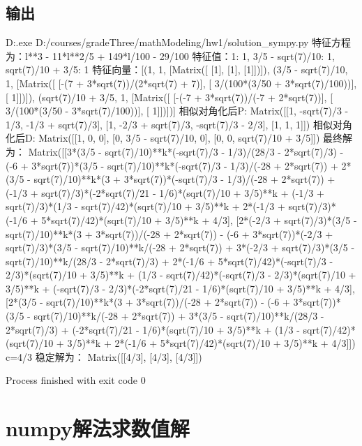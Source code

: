 \subsection{输出}
\begin{python}
D:\program\Anaconda\python.exe D:/courses/gradeThree/mathModeling/hw1/solution_sympy.py
特征方程为：l**3 - 11*l**2/5 + 149*l/100 - 29/100
特征值：{1: 1, 3/5 - sqrt(7)/10: 1, sqrt(7)/10 + 3/5: 1}
特征向量：[(1, 1, [Matrix([
[1],
[1],
[1]])]), (3/5 - sqrt(7)/10, 1, [Matrix([
[-(7 + 3*sqrt(7))/(2*sqrt(7) + 7)],
[  3/(100*(3/50 + 3*sqrt(7)/100))],
[                               1]])]), (sqrt(7)/10 + 3/5, 1, [Matrix([
[-(-7 + 3*sqrt(7))/(-7 + 2*sqrt(7))],
[    3/(100*(3/50 - 3*sqrt(7)/100))],
[                                 1]])])]
相似对角化后P:
Matrix([[1, -sqrt(7)/3 - 1/3, -1/3 + sqrt(7)/3], [1, -2/3 + sqrt(7)/3, -sqrt(7)/3 - 2/3], [1, 1, 1]])
相似对角化后D:
Matrix([[1, 0, 0], [0, 3/5 - sqrt(7)/10, 0], [0, 0, sqrt(7)/10 + 3/5]])
最终解为：
Matrix([[3*(3/5 - sqrt(7)/10)**k*(-sqrt(7)/3 - 1/3)/(28/3 - 2*sqrt(7)/3) - (-6 + 3*sqrt(7))*(3/5 - sqrt(7)/10)**k*(-sqrt(7)/3 - 1/3)/(-28 + 2*sqrt(7)) + 2*(3/5 - sqrt(7)/10)**k*(3 + 3*sqrt(7))*(-sqrt(7)/3 - 1/3)/(-28 + 2*sqrt(7)) + (-1/3 + sqrt(7)/3)*(-2*sqrt(7)/21 - 1/6)*(sqrt(7)/10 + 3/5)**k + (-1/3 + sqrt(7)/3)*(1/3 - sqrt(7)/42)*(sqrt(7)/10 + 3/5)**k + 2*(-1/3 + sqrt(7)/3)*(-1/6 + 5*sqrt(7)/42)*(sqrt(7)/10 + 3/5)**k + 4/3], [2*(-2/3 + sqrt(7)/3)*(3/5 - sqrt(7)/10)**k*(3 + 3*sqrt(7))/(-28 + 2*sqrt(7)) - (-6 + 3*sqrt(7))*(-2/3 + sqrt(7)/3)*(3/5 - sqrt(7)/10)**k/(-28 + 2*sqrt(7)) + 3*(-2/3 + sqrt(7)/3)*(3/5 - sqrt(7)/10)**k/(28/3 - 2*sqrt(7)/3) + 2*(-1/6 + 5*sqrt(7)/42)*(-sqrt(7)/3 - 2/3)*(sqrt(7)/10 + 3/5)**k + (1/3 - sqrt(7)/42)*(-sqrt(7)/3 - 2/3)*(sqrt(7)/10 + 3/5)**k + (-sqrt(7)/3 - 2/3)*(-2*sqrt(7)/21 - 1/6)*(sqrt(7)/10 + 3/5)**k + 4/3], [2*(3/5 - sqrt(7)/10)**k*(3 + 3*sqrt(7))/(-28 + 2*sqrt(7)) - (-6 + 3*sqrt(7))*(3/5 - sqrt(7)/10)**k/(-28 + 2*sqrt(7)) + 3*(3/5 - sqrt(7)/10)**k/(28/3 - 2*sqrt(7)/3) + (-2*sqrt(7)/21 - 1/6)*(sqrt(7)/10 + 3/5)**k + (1/3 - sqrt(7)/42)*(sqrt(7)/10 + 3/5)**k + 2*(-1/6 + 5*sqrt(7)/42)*(sqrt(7)/10 + 3/5)**k + 4/3]])
c=4/3
稳定解为：
Matrix([[4/3], [4/3], [4/3]])

Process finished with exit code 0

\end{python}
\section{numpy解法求数值解}
